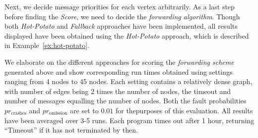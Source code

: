 \documentclass{sig-alternate-05-2015}[9pt]
\theoremstyle{definition}
\begin{document}
		Next, we decide message priorities for each vertex arbitrarily.
		As a last step before finding the {\em Score}, we need to decide the {\em forwarding algorithm}. Though both {\em Hot-Potato} and {\em Fallback} approaches have been implemented, all results displayed have been obtained using the {\em Hot-Potato} approach, which is described in Example~\ref{ex:hot-potato}. 

		We elaborate on the different approaches for scoring the {\em forwarding scheme} generated above and show corresponding run times obtained using settings ranging from 4 nodes to 45 nodes. Each setting contains a relatively dense graph, with number of edges being 2 times the number of nodes, the timeout and number of messages equalling the number of nodes. Both the fault probabilities $pr_{\text{crashes}}$ and $pr_{\text{omission}}$ are set to $0.01$ for thepurposes of this evaluation. All results have been averaged over 3-5 runs. Each program times out after 1 hour, returning ``Timeout'' if it has not terminated by then.
\end{document}
